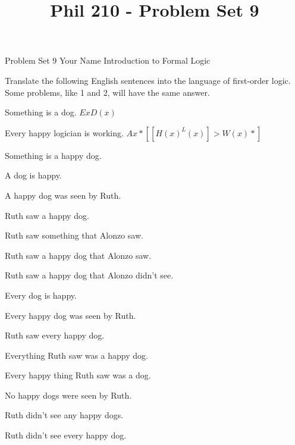 
\title{Phil 210 - Problem Set 9}

\heading
Problem Set 9
Your Name
Introduction to Formal Logic
\endheading

Translate the following English sentences into the language of first-order logic. Some problems, like 1 and 2, will have the same answer.

\quantifiers
\problems
{}
Something is a dog.
        \answer 
        $ Ex D(x) $
        \endanswer\Bigskip

Every happy logician is working.
        \answer 
        $ Ax*[[H(x) ^ L(x)] > W(x)*] $
        \endanswer

Something is a happy dog.
        \answer
        $ $
        \endanswer

A dog is happy.
        \answer
        $ $
        \endanswer

A happy dog was seen by Ruth.
        \answer
        $ $
        \endanswer

Ruth saw a happy dog.
        \answer
        $ $
        \endanswer

Ruth saw something that Alonzo saw.
        \answer
        $ $
        \endanswer

Ruth saw a happy dog that Alonzo saw.
        \answer
        $ $
        \endanswer

Ruth saw a happy dog that Alonzo didn't see.
        \answer
        $ $
        \endanswer

Every dog is happy.
        \answer
        $ $
        \endanswer

Every happy dog was seen by Ruth.
        \answer
        $ $
        \endanswer

Ruth saw every happy dog.
        \answer
        $ $
        \endanswer

Everything Ruth saw was a happy dog.
        \answer
        $ $
        \endanswer

Every happy thing Ruth saw was a dog.
        \answer
        $ $
        \endanswer

No happy dogs were seen by Ruth.
        \answer
        $ $
        \endanswer

Ruth didn't see any happy dogs.
        \answer
        $ $
        \endanswer

Ruth didn't see every happy dog.
        \answer
        $ $
        \endanswer

